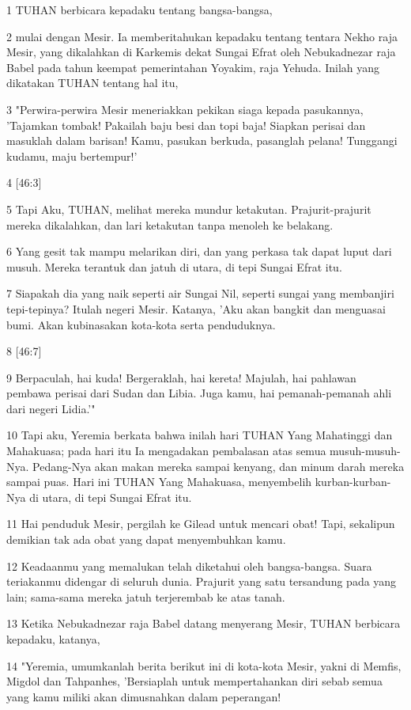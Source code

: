 \par 1 TUHAN berbicara kepadaku tentang bangsa-bangsa,
\par 2 mulai dengan Mesir. Ia memberitahukan kepadaku tentang tentara Nekho raja Mesir, yang dikalahkan di Karkemis dekat Sungai Efrat oleh Nebukadnezar raja Babel pada tahun keempat pemerintahan Yoyakim, raja Yehuda. Inilah yang dikatakan TUHAN tentang hal itu,
\par 3 "Perwira-perwira Mesir meneriakkan pekikan siaga kepada pasukannya, 'Tajamkan tombak! Pakailah baju besi dan topi baja! Siapkan perisai dan masuklah dalam barisan! Kamu, pasukan berkuda, pasanglah pelana! Tunggangi kudamu, maju bertempur!'
\par 4 [46:3]
\par 5 Tapi Aku, TUHAN, melihat mereka mundur ketakutan. Prajurit-prajurit mereka dikalahkan, dan lari ketakutan tanpa menoleh ke belakang.
\par 6 Yang gesit tak mampu melarikan diri, dan yang perkasa tak dapat luput dari musuh. Mereka terantuk dan jatuh di utara, di tepi Sungai Efrat itu.
\par 7 Siapakah dia yang naik seperti air Sungai Nil, seperti sungai yang membanjiri tepi-tepinya? Itulah negeri Mesir. Katanya, 'Aku akan bangkit dan menguasai bumi. Akan kubinasakan kota-kota serta penduduknya.
\par 8 [46:7]
\par 9 Berpaculah, hai kuda! Bergeraklah, hai kereta! Majulah, hai pahlawan pembawa perisai dari Sudan dan Libia. Juga kamu, hai pemanah-pemanah ahli dari negeri Lidia.'"
\par 10 Tapi aku, Yeremia berkata bahwa inilah hari TUHAN Yang Mahatinggi dan Mahakuasa; pada hari itu Ia mengadakan pembalasan atas semua musuh-musuh-Nya. Pedang-Nya akan makan mereka sampai kenyang, dan minum darah mereka sampai puas. Hari ini TUHAN Yang Mahakuasa, menyembelih kurban-kurban-Nya di utara, di tepi Sungai Efrat itu.
\par 11 Hai penduduk Mesir, pergilah ke Gilead untuk mencari obat! Tapi, sekalipun demikian tak ada obat yang dapat menyembuhkan kamu.
\par 12 Keadaanmu yang memalukan telah diketahui oleh bangsa-bangsa. Suara teriakanmu didengar di seluruh dunia. Prajurit yang satu tersandung pada yang lain; sama-sama mereka jatuh terjerembab ke atas tanah.
\par 13 Ketika Nebukadnezar raja Babel datang menyerang Mesir, TUHAN berbicara kepadaku, katanya,
\par 14 "Yeremia, umumkanlah berita berikut ini di kota-kota Mesir, yakni di Memfis, Migdol dan Tahpanhes, 'Bersiaplah untuk mempertahankan diri sebab semua yang kamu miliki akan dimusnahkan dalam peperangan!
